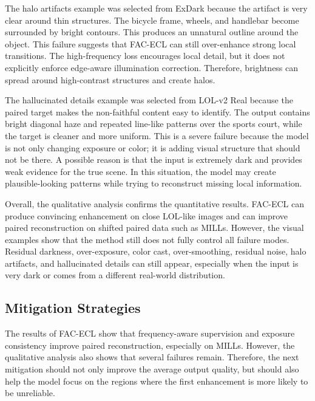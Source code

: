 The halo artifacts example was selected from ExDark because the artifact is very clear around thin structures. The bicycle frame, wheels, and handlebar become surrounded by bright contours. This produces an unnatural outline around the object. This failure suggests that FAC-ECL can still over-enhance strong local transitions. The high-frequency loss encourages local detail, but it does not explicitly enforce edge-aware illumination correction. Therefore, brightness can spread around high-contrast structures and create halos.

The hallucinated details example was selected from LOL-v2 Real because the paired target makes the non-faithful content easy to identify. The output contains bright diagonal haze and repeated line-like patterns over the sports court, while the target is cleaner and more uniform. This is a severe failure because the model is not only changing exposure or color; it is adding visual structure that should not be there. A possible reason is that the input is extremely dark and provides weak evidence for the true scene. In this situation, the model may create plausible-looking patterns while trying to reconstruct missing local information.

Overall, the qualitative analysis confirms the quantitative results. FAC-ECL can produce convincing enhancement on close LOL-like images and can improve paired reconstruction on shifted paired data such as MILLs. However, the visual examples show that the method still does not fully control all failure modes. Residual darkness, over-exposure, color cast, over-smoothing, residual noise, halo artifacts, and hallucinated details can still appear, especially when the input is very dark or comes from a different real-world distribution.

\subsection{Mitigation Strategies}

The results of FAC-ECL show that frequency-aware supervision and exposure consistency improve paired reconstruction, especially on MILLs. However, the qualitative analysis also shows that several failures remain. Therefore, the next mitigation should not only improve the average output quality, but should also help the model focus on the regions where the first enhancement is more likely to be unreliable.

